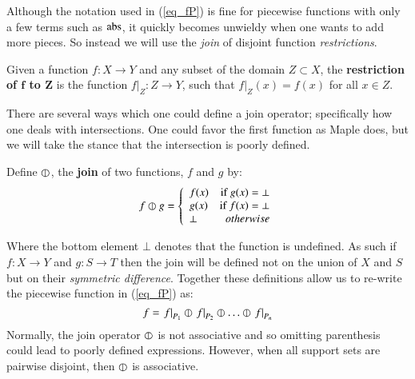Although the notation used in (\ref{eq_fP}) is fine for piecewise functions with only a few terms such as $\text{abs}$,
it quickly becomes unwieldy when one wants to add more pieces.
So instead we will use the \emph{join} of disjoint function \emph{restrictions}.
\begin{definition}
	Given a function $f:X \to Y$ and any subset of the domain $Z \subset X$, 
	the \textbf{restriction of $\boldsymbol{f}$ to $\boldsymbol{Z}$} is the function $f|_Z : Z \to Y$, 
	such that $f|_Z(x) = f(x)$ for all $x \in Z$.
\end{definition}


There are several ways which one could define a join operator; specifically how one deals with intersections.
One could favor the first function as Maple does, but we will take the stance that the intersection is poorly defined.
\begin{definition}
	Define $\varobar$, the \textbf{join} of two functions, $f$ and $g$ by:
	\begin{equation}
	\label{def:fjoin}
		f \varobar g =  
		\left\{
	     		\begin{array}{lr}
	       		f(x) & \text{if } g(x) = \bot \\
	       		g(x) & \text{if } f(x) = \bot \\
	       		\bot & otherwise
	     		\end{array}
	   	\right.
	\end{equation}
\end{definition}
Where the bottom element $\bot$ denotes that the function is undefined.
As such if $f:X \to Y$ and $g:S \to T$ then the join will be defined not on the union of $X$ and $S$ but on their 
\emph{symmetric difference}.
Together these definitions allow us to re-write the piecewise function in (\ref{eq_fP}) as:
\begin{equation*}
	f = \left.f\right|_{P_1} \varobar \left.f\right|_{P_2} \varobar \ldots \varobar \left.f\right|_{P_n}
\end{equation*}
Normally, the join operator $\varobar$ is not associative and so omitting parenthesis could lead to poorly defined expressions.
However, when all support sets are pairwise disjoint, then $\varobar$ is associative.


